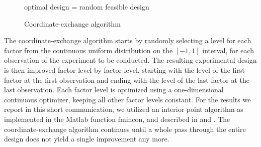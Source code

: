 \begin{figure}[H]
\begin{algorithm}[H]
\label{pseudo1}
optimal design = random feasible design\;
	\end{algorithm}
	\caption{Coordinate-exchange algorithm}
\end{figure}

The coordinate-exchange algorithm starts by randomly selecting a level for each factor from the continuous uniform distribution on the $[-1,1]$ interval, for each observation of the experiment to be conducted. The resulting experimental design is then improved factor level by factor level, starting with the level of the first factor at the first observation and ending with the level of the last factor at the last observation. Each factor level is optimized using a one-dimensional continuous optimizer, keeping all other factor levels constant. For the results we report in this short communication, we utilized an interior point algorithm as implemented in the Matlab function fmincon, and described in \citet{byrd,byrd2} and \citet{waltz}. The coordinate-exchange algorithm continues until a whole pass through the entire design does not yield a single improvement any more.\\

